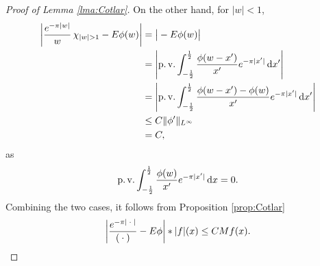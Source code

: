 \documentclass[../dissertation.tex]{subfiles}
\begin{document}
\begin{proof}[Proof of Lemma \ref{lma:Cotlar}]
    On the other hand, for $|w| < 1$, 
    \begin{align*}
        \left| \frac{e^{-\pi|w|}}{w} \, \chi_{|w| > 1} - E \phi(w) \right|
        	&= \big| - E \phi(w) \big| \\
            &=
                \left| 
                    \operatorname{p.v.} \int_{-\frac{1}{2}}^{\frac{1}{2}} 
                        \frac{\phi(w-x')}{x'} e^{-\pi|x'|} 
                  \, \mathrm{d}x'
                 \right| \\
            &= 
                \left| 
                    \operatorname{p.v.} \int_{-\frac{1}{2}}^{\frac{1}{2}} 
                        \frac{\phi(w-x') -\phi(w)}{x'} e^{-\pi|x'|} 
                    \, \mathrm{d}x' 
                \right| \\
            &\leq C \| \phi' \|_{L^\infty} \\
            &=C,
    \end{align*}
    as
    \[
        \operatorname{p.v.} \int_{-\frac{1}{2}}^{\frac{1}{2}} 
            \frac{\phi(w)}{x'} e^{-\pi|x'|}
        \, \mathrm{d}x
        = 0.
    \]
    Combining the two cases, it follows from Proposition \ref{prop:Cotlar}
    \begin{align}\label{eq:3-Cotlar}
        \left| \frac{e^{-\pi|\kern 0.5ex \cdot \kern 0.5ex|}}{(\kern 0.5ex \cdot \kern 0.5ex)} - E \phi \right|*|f|(x)
            \leq C Mf(x).
    \end{align}
    

\end{proof}
\end{document}
